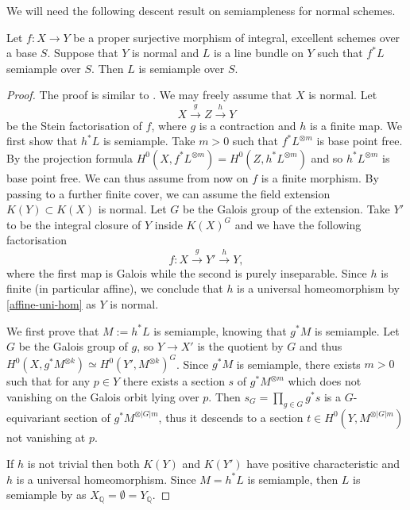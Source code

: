 	We will need the following descent result on semiampleness for normal schemes.
	
	\begin{lemma}\label{pullback}
		
		Let $f \colon X \to Y$ be a proper surjective morphism of integral, excellent schemes over a base $S$. Suppose that $Y$ is normal and $L$  is a line bundle on $Y$ such that $f^{*}L$ semiample over $S$.
		Then $L$ is semiample over $S$.
		
	\end{lemma}
	
	\begin{proof}
		
		The proof is similar to \cite[Lemma 2.10]{Keel}.	
		We may freely assume that $X$ is normal. 
		Let $$X \xrightarrow{g} Z \xrightarrow{h} Y$$ be the Stein factorisation of $f$, where $g$ is a contraction and $h$ is a finite map. 
		We first show that $h^*L$ is semiample. Take $m>0$ such that $f^*L^{\otimes m}$ is base point free. By the projection formula $H^0(X, f^*L^{\otimes m})=H^0(Z, h^*L^{\otimes m})$ and so $h^*L^{\otimes m}$ is base point free.
		We can thus assume from now on $f$ is a finite morphism.
		By passing to a further finite cover, we can assume the field extension $K(Y) \subset K(X)$ is normal. Let $G$ be the Galois group of the extension.
		Take $Y'$ to be the integral closure of $Y$ inside $K(X)^G$ and we have the following factorisation 
		$$f \colon X \xrightarrow{g} Y' \xrightarrow{h} Y,$$ 
		where the first map is Galois while the second is purely inseparable. Since $h$ is finite (in particular affine), we conclude that $h$ is a universal homeomorphism by \autoref{affine-uni-hom}  as $Y$ is normal. 
		
		We first prove that $M:=h^*L$ is semiample, knowing that $g^*M$ is semiample.
		Let $G$ be the Galois group of $g$, so $Y \to X'$ is the quotient by $G$ and thus $H^{0}(X,g^*M^{\otimes k})\simeq H^{0}(Y',M^{\otimes k})^{G}$. 
		Since $g^*M$ is semiample, there exists $m > 0$ such that for any $p \in Y$ there exists a section $s$ of $g^{*}M^{\otimes m}$ which does not vanishing on the Galois orbit lying over $p$. Then $s_{G}=\prod_{g \in G} g^*s $ is a $G$-equivariant section of $g^*M^{\otimes |G|m}$, thus it descends to a section $t \in H^0(Y, M^{\otimes |G|m})$ not vanishing at $p$.
		
	 	If $h$ is not trivial then both $K(Y)$ and $K(Y')$ have positive characteristic and $h$ is a universal homeomorphism. Since $M=h^{*}L$ is semiample, then $L$ is semiample by \cite[Proposition 3.5]{witaszek2020keels} as $X_{\mathbb{Q}}=\emptyset=Y_{\mathbb{Q}}$.
	\end{proof}
	
